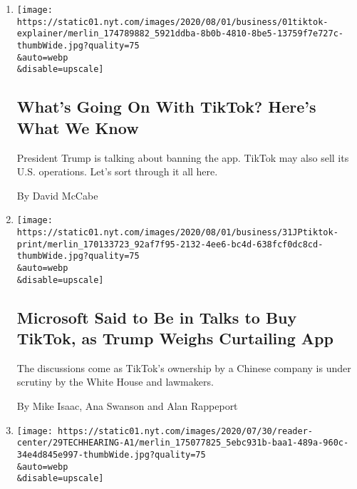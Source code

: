 \begin{enumerate}
\def\labelenumi{\arabic{enumi}.}
\item
  \href{/2020/08/01/technology/tiktok-trump-microsoft-bytedance-china-ban.html}{}

  \texttt{[image: https://static01.nyt.com/images/2020/08/01/business/01tiktok-explainer/merlin\_174789882\_5921ddba-8b0b-4810-8be5-13759f7e727c-thumbWide.jpg?quality=75\\\&auto=webp\\\&disable=upscale]}

  \hypertarget{whats-going-on-with-tiktok-heres-what-we-know}{%
  \subsection{What's Going On With TikTok? Here's What We
  Know}\label{whats-going-on-with-tiktok-heres-what-we-know}}

  President Trump is talking about banning the app. TikTok may also sell
  its U.S. operations. Let's sort through it all here.

  By David McCabe
\item
  \href{/2020/07/31/technology/tiktok-microsoft.html}{}

  \texttt{[image: https://static01.nyt.com/images/2020/08/01/business/31JPtiktok-print/merlin\_170133723\_92af7f95-2132-4ee6-bc4d-638fcf0dc8cd-thumbWide.jpg?quality=75\\\&auto=webp\\\&disable=upscale]}

  \hypertarget{microsoft-said-to-be-in-talks-to-buy-tiktok-as-trump-weighs-curtailing-app}{%
  \subsection{Microsoft Said to Be in Talks to Buy TikTok, as Trump
  Weighs Curtailing
  App}\label{microsoft-said-to-be-in-talks-to-buy-tiktok-as-trump-weighs-curtailing-app}}

  The discussions come as TikTok's ownership by a Chinese company is
  under scrutiny by the White House and lawmakers.

  By Mike Isaac, Ana Swanson and Alan Rappeport
\item
  \href{/2020/07/29/technology/big-tech-hearing-apple-amazon-facebook-google.html}{}

  \texttt{[image: https://static01.nyt.com/images/2020/07/30/reader-center/29TECHHEARING-A1/merlin\_175077825\_5ebc931b-baa1-489a-960c-34e4d845e997-thumbWide.jpg?quality=75\\\&auto=webp\\\&disable=upscale]}

  \hypertarget{lawmakers-united-in-their-ire-lash-out-at-big-techs-leaders}{%
}
\end{enumerate}
